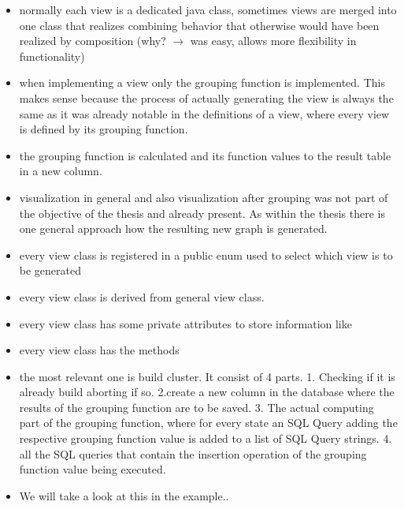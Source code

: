 \documentclass[preview]{standalone}
\begin{document}
\begin{itemize}
	\item normally each view is a dedicated java class, sometimes views are merged into one class that realizes combining behavior that otherwise would have been realized by composition (why? $\to$ was easy, allows more flexibility in functionality)
	\item when implementing a view only the grouping function is implemented. This makes sense because the process of actually generating the view is always the same as it was already notable in the definitions of a view, where every view is defined by its grouping function.
	\item the grouping function is calculated and its function values to the result table in a new column.
	\item visualization in general and also visualization after grouping was not part of the objective of the thesis and already present. As within the thesis there is one general approach how the resulting new graph is generated.
	\item every view class is registered in a public enum used to select which view is to be generated
	\item every view class is derived from general view class.
	\item every view class has some private attributes to store information like
	\item every view class has the methods
	\item the most relevant one is build cluster. It consist of 4 parts. 1. Checking if it is already build aborting if so. 2.create a new column in the database where the results of the grouping function are to be saved. 3. The actual computing part of the grouping function, where for every state an SQL Query adding the respective grouping function value is added to a list of SQL Query strings. 4. all the SQL queries that contain the insertion operation of the grouping function value being executed.
	\item We will take a look at this in the example..
	
\end{itemize}
\end{document}

